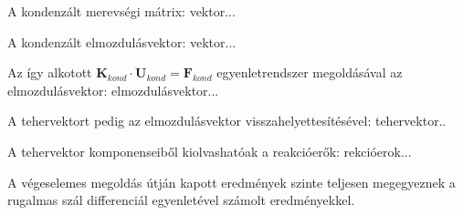 \documentclass{article}
\begin{document}
		A kondenzált merevségi mátrix:
		vektor...
		
		A kondenzált elmozdulásvektor:
		vektor...
		
		Az így alkotott $\textbf{K}_{kond}\cdot\textbf{U}_{kond}=\textbf{F}_{kond}$ egyenletrendszer megoldásával az elmozdulásvektor:
		elmozdulásvektor...
		
		A tehervektort pedig az elmozdulásvektor visszahelyettesítésével:
		tehervektor..
		
		A tehervektor komponenseiből kiolvashatóak a reakcióerők:
		rekcióerok...
		
		A végeselemes megoldás útján kapott eredmények szinte teljesen megegyeznek a rugalmas szál differenciál egyenletével számolt eredményekkel.
		
		
		
		
		
		
		
	
			
	
	
	
\end{document}

